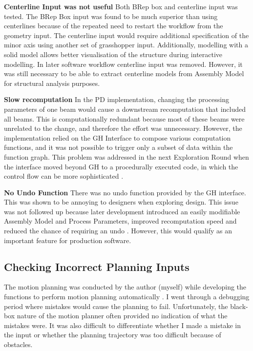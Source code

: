 \textbf{Centerline Input was not useful} Both BRep box and centerline input was tested. The BRep Box input was found to be much superior than using centerlines because of the repeated need to restart the workflow from the geometry input. The centerline input would require additional specification of the minor axis using another set of grasshopper input. Additionally, modelling with a solid model allows better visualisation of the structure during interactive modelling. In later software workflow centerline input was removed. However, it was still necessary to be able to extract centerline models from Assembly Model for structural analysis purposes.

\textbf{Slow recomputation} In the PD implementation, changing the processing parameters of one beam would cause a downstream recomputation that included all beams. This is computationally redundant because most of these beams were unrelated to the change, and therefore the effort was unnecessary. However, the implementation relied on the GH Interface to compose various computation functions, and it was not possible to trigger only a subset of data within the function graph. This problem was addressed in the next Exploration Round when the interface moved beyond GH to a procedurally executed code, in which the control flow can be more sophisticated .

\textbf{No Undo Function} There was no undo function provided by the GH interface. This was shown to be annoying to designers when exploring design. This issue was not followed up because later development introduced an easily modifiable Assembly Model and Process Parameters, improved recomputation speed and reduced the chance of requiring an undo . However, this would qualify as an important feature for production software. 

\subsection{Checking Incorrect Planning Inputs}
\label{subsection:exploration-2-checking-incorrect-planning-inputs}

The motion planning was conducted by the author (myself) while developing the functions to perform motion planning automatically . I went through a debugging period where mistakes would cause the planning to fail. Unfortunately, the black-box nature of the motion planner often provided no indication of what the mistakes were. It was also difficult to differentiate whether I made a mistake in the input or whether the planning trajectory was too difficult because of obstacles. 

